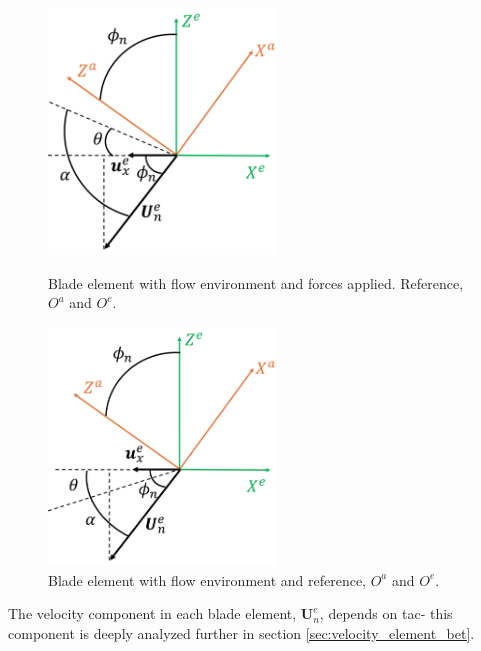 \begin{figure}[!htb]
    \centering
    \begin{minipage}[b]{0.48\textwidth}
        \centering
        \includegraphics[width=6cm]{Figures/background/bet/angles_theta_pos.png}
        \caption{Blade element with flow environment and forces applied. Reference, $O^a$ and $O^e$.}
        \label{fig:phi_angle_pos}
    \end{minipage}
    \hfill
    \begin{minipage}[b]{0.48\textwidth}
        \centering
        \includegraphics[width=6cm]{Figures/background/bet/angles_theta_neg.png}
        \caption{Blade element with flow environment and reference, $O^a$ and $O^e$.}
        \label{fig:phi_angle_neg}
    \end{minipage}
\end{figure}

The velocity component in each blade element, $\mathbf{U}_n^e$,  depends on   tac{- this component} is deeply analyzed further in section \ref{sec:velocity_element_bet}. 

